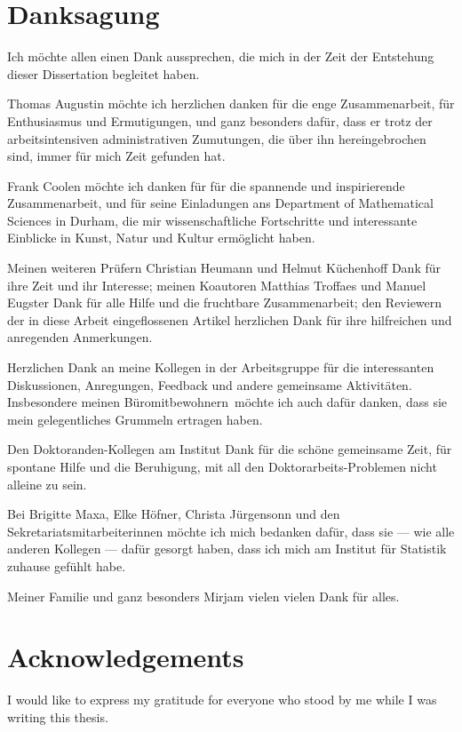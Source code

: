 
{}
\chapter*{Danksagung}

Ich möchte allen einen Dank aussprechen,
die mich in der Zeit der Entstehung dieser Dissertation begleitet haben.

Thomas Augustin möchte ich herzlichen danken für die enge Zusammenarbeit,
für Enthusiasmus und Ermutigungen, und ganz besonders dafür, dass er
trotz der arbeitsintensiven administrativen Zumutungen,
die über ihn hereingebrochen sind, immer für mich Zeit gefunden hat.

Frank Coolen möchte ich danken für für die spannende und inspirierende Zusammenarbeit,
und für seine Einladungen ans Department of Mathematical Sciences in Durham,
die mir wissenschaftliche Fortschritte und interessante Einblicke in Kunst, Natur und Kultur ermöglicht haben.

Meinen weiteren Prüfern Christian Heumann und Helmut Küchenhoff Dank für ihre Zeit und ihr Interesse;
meinen Koautoren Matthias Troffaes und Manuel Eugster Dank für alle Hilfe und die fruchtbare Zusammenarbeit;
den Reviewern der in diese Arbeit eingeflossenen Artikel herzlichen Dank für ihre hilfreichen und anregenden Anmerkungen.

Herzlichen Dank an meine Kollegen in der Arbeitsgruppe für die interessanten Diskussionen, Anregungen, Feedback
und andere gemeinsame Aktivitäten.
Insbesondere meinen \glqq Büromitbewohnern\grqq\ möchte ich auch dafür danken,
dass sie mein gelegentliches Grummeln ertragen haben.

Den Doktoranden-Kollegen am Institut Dank für die schöne gemeinsame Zeit,
für spontane Hilfe und die Beruhigung, mit all den Doktorarbeits-Problemen nicht alleine zu sein.

Bei Brigitte Maxa, Elke Höfner, Christa Jürgensonn und den Sekretariatsmitarbeiterinnen
möchte ich mich bedanken dafür, dass sie --- wie alle anderen Kollegen --- dafür gesorgt haben,
dass ich mich am Institut für Statistik zuhause gefühlt habe.

Meiner Familie und ganz besonders Mirjam vielen vielen Dank für alles.\\

\chapter*{Acknowledgements}
I would like to express my gratitude for everyone who stood by me while I was writing this thesis.

